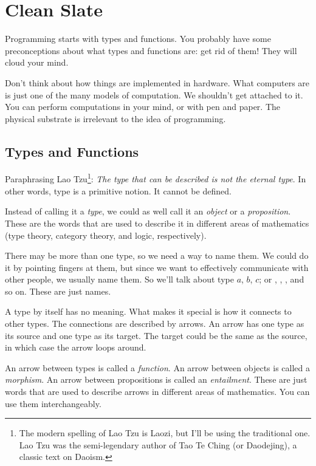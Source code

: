 \documentclass[DaoFP]{subfiles}
\begin{document}
\chapter{Clean Slate}

Programming starts with types and functions. You probably have some preconceptions about what types and functions are: get rid of them! They will cloud your mind.

Don't think about how things are implemented in hardware. What computers are is just one of the many models of computation. We shouldn't get attached to it. You can perform computations in your mind, or with pen and paper. The physical substrate is irrelevant to the idea of programming.

\section{Types and Functions}

Paraphrasing Lao Tzu\footnote{The modern spelling of Lao Tzu is Laozi, but I'll be using the traditional one. Lao Tzu was the semi-legendary author of Tao Te Ching (or Daodejing), a classic text on Daoism.}: \emph{The type that can be described is not the eternal type}. In other words, type is a primitive notion. It cannot be defined.

Instead of calling it a \emph{type}, we could as well call it an \emph{object} or a \emph{proposition}. These are the words that are used to describe it in different areas of mathematics (type theory, category theory, and logic, respectively).

There may be more than one type, so we need a way to name them. We could do it by pointing fingers at them, but since we want to effectively communicate with other people, we usually name them. So we'll talk about type $a$, $b$, $c$; or , , , and so on. These are just names.

A type by itself has no meaning. What makes it special is how it connects to other types. The connections are described by arrows. An arrow has one type as its source and one type as its target. The target could be the same as the source, in which case the arrow loops around.

An arrow between types is called a \emph{function}. An arrow between objects is called a \emph{morphism}. An arrow between propositions is called an \emph{entailment}. These are just words that are used to describe arrows in different areas of mathematics. You can use them interchangeably.
\end{document}
